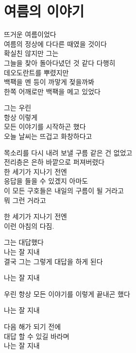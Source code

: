 \documentclass[12pt, b6paper, openany]{memoir}
\newenvironment{article}{}{}
\begin{document}
\begin{article}
\hypertarget{uxc5ecuxb984uxc758-uxc774uxc57cuxae30}{%
\chapter{여름의 이야기}\label{uxc5ecuxb984uxc758-uxc774uxc57cuxae30}}

뜨거운 여름이었다\\
여름의 정상에 다다른 때였을 것이다\\
확실친 않지만 그는\\
그늘을 찾아 돌아다녔던 것 같다 다행히\\
데오도란트를 뿌렸지만\\
백팩을 멘 등이 까맣게 젖을까봐\\
한쪽 어깨로만 백팩을 메고 있었다

그는 우린\\
항상 이렇게\\
모든 이야기를 시작하곤 했다\\
오늘 날씨는 뜨겁고 화창하다고

목소리를 다시 내려 보낼 구름 같은 건 없었고\\
전리층은 은하 바깥으로 퍼져버렸다\\
한 세기가 지나기 전엔\\
응답을 들을 수 있겠지 아마도\\
이 모든 구호들은 내일의 구름이 될 거라고\\
뭐 그런 거라고

한 세기가 지나기 전엔\\
이런 아침의 다짐.

그는 대답했다\\
나는 잘 지내\\
결국 그는 그렇게 대답을 하게 된다

나는 잘 지내

우린 항상 모든 이야기를 이렇게 끝내곤 했다

나는 잘 지내

다음 해가 되기 전에\\
대답 할 수 있길 바라며\\
나는 잘 지내
\end{article}
\end{document}
